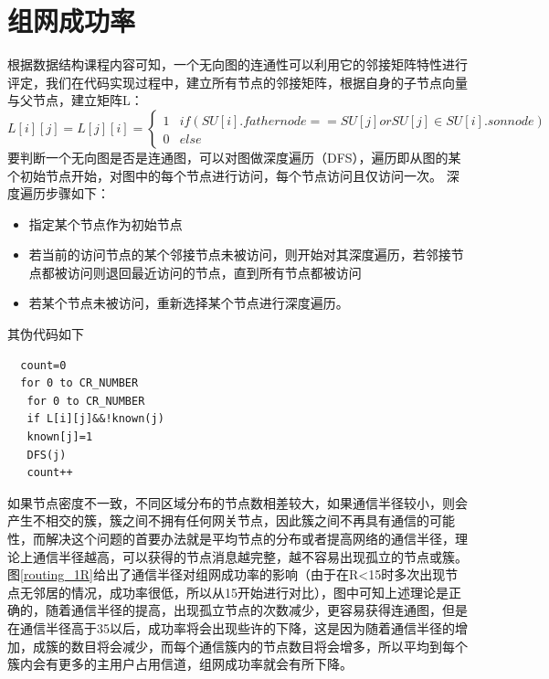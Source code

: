 \documentclass[a4paper,AutoFakeBold,oneside,12pt]{book}
\begin{document}
  \section{组网成功率}
  根据数据结构课程内容可知，一个无向图的连通性可以利用它的邻接矩阵特性进行评定，我们在代码实现过程中，建立所有节点的邻接矩阵，根据自身的子节点向量与父节点，建立矩阵L：
  \begin{equation}
  L[i][j]= L[j][i] =
\left\{  
             \begin{array}{lr}  
             1 &if (SU[i].fathernode==SU[j] or SU[j]\in SU[i].sonnode)  \\  
       
             0 &else
             \end{array}  
\right.  
\end{equation}
  要判断一个无向图是否是连通图，可以对图做深度遍历（DFS），遍历即从图的某个初始节点开始，对图中的每个节点进行访问，每个节点访问且仅访问一次。
  深度遍历步骤如下：
  \begin{itemize}
  \item 指定某个节点作为初始节点
  \item 若当前的访问节点的某个邻接节点未被访问，则开始对其深度遍历，若邻接节点都被访问则退回最近访问的节点，直到所有节点都被访问
  \item 若某个节点未被访问，重新选择某个节点进行深度遍历。
  \end{itemize}
  其伪代码如下
  \begin{lstlisting}
  count=0
  for 0 to CR_NUMBER
   for 0 to CR_NUMBER
   if L[i][j]&&!known(j)
   known[j]=1
   DFS(j)
   count++
\end{lstlisting}
  如果节点密度不一致，不同区域分布的节点数相差较大，如果通信半径较小，则会产生不相交的簇，簇之间不拥有任何网关节点，因此簇之间不再具有通信的可能性，而解决这个问题的首要办法就是平均节点的分布或者提高网络的通信半径，理论上通信半径越高，可以获得的节点消息越完整，越不容易出现孤立的节点或簇。图\ref{routing_1R}给出了通信半径对组网成功率的影响（由于在R<15时多次出现节点无邻居的情况，成功率很低，所以从15开始进行对比），图中可知上述理论是正确的，随着通信半径的提高，出现孤立节点的次数减少，更容易获得连通图，但是在通信半径高于35以后，成功率将会出现些许的下降，这是因为随着通信半径的增加，成簇的数目将会减少，而每个通信簇内的节点数目将会增多，所以平均到每个簇内会有更多的主用户占用信道，组网成功率就会有所下降。
\end{document}

